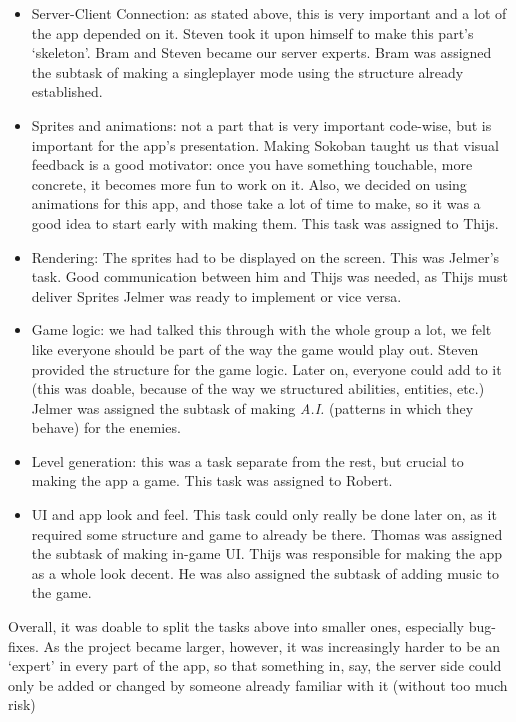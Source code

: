 \documentclass[../main.tex]{subfiles}
\begin{document}
\begin{itemize}
	\item Server-Client Connection: as stated above, this is very important and a lot of the app depended on it. Steven took it upon himself to make this part's `skeleton'. Bram and Steven became our server experts. Bram was assigned the subtask of making a singleplayer mode using the structure already established.
	\item Sprites and animations: not a part that is very important code-wise, but is important for the app's presentation. Making Sokoban taught us that visual feedback is a good motivator: once you have something touchable, more concrete, it becomes more fun to work on it. Also, we decided on using animations for this app, and those take a lot of time to make, so it was a good idea to start early with making them. This task was assigned to Thijs.
	\item Rendering: The sprites had to be displayed on the screen. This was Jelmer's task. Good communication between him and Thijs was needed, as Thijs must deliver Sprites Jelmer was ready to implement or vice versa.
	\item Game logic: we had talked this through with the whole group a lot, we felt like everyone should be part of the way the game would play out. Steven provided the structure for the game logic. Later on, everyone could add to it (this was doable, because of the way we structured abilities, entities, etc.) Jelmer was assigned the subtask of making \textit{A.I.} (patterns in which they behave) for the enemies. 
	\item Level generation: this was a task separate from the rest, but crucial to making the app a game. This task was assigned to Robert.
	\item UI and app look and feel. This task could only really be done later on, as it required some structure and game to already be there. Thomas was assigned the subtask of making in-game UI. Thijs was responsible for making the app as a whole look decent. He was also assigned the subtask of adding music to the game.
\end{itemize}

Overall, it was doable to split the tasks above into smaller ones, especially bug-fixes. As the project became larger, however, it was increasingly harder to be an `expert' in every part of the app, so that something in, say, the server side could only be added or changed by someone already familiar with it (without too much risk)
\end{document}
